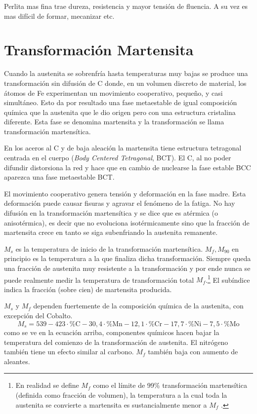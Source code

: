 Perlita mas fina trae dureza, resistencia y mayor tensión de fluencia. A su vez es mas difícil de formar, mecanizar etc.

\section{Transformación Martensita}
Cuando la austenita se sobrenfría hasta temperaturas muy bajas se produce una transformación sin difusión de C donde, en un volumen discreto de material, los átomos de Fe experimentan un movimiento cooperativo, pequeño, y casi simultáneo. Esto da por resultado una fase metaestable de igual composición química que la austenita que le dio origen pero con una estructura cristalina diferente. Esta fase se denomina martensita y la transformación se llama transformación martensítica.

En los aceros al C y de baja aleación la martensita tiene estructura tetragonal centrada en el cuerpo (\textit{Body Centered Tetragonal}, BCT). El C, al no poder difundir distorsiona la red y hace que en cambio de nuclearse la fase estable BCC aparezca una fase metaestable BCT.

El movimiento cooperativo genera tensión y deformación en la fase madre. Esta deformación puede causar fisuras y agravar el fenómeno de la fatiga. No hay difusión en la transformación martensítica y se dice que es atérmica (o anisotérmica), es decir que no evoluciona isotérmicamente sino que la fracción de martensita crece en tanto se siga subenfriando la austenita remanente.

$M_s$ es la temperatura de inicio de la transformación martensítica. $M_f,M_{90}$ en principio es la temperatura a la que finaliza dicha transformación. Siempre queda una fracción de austenita muy resistente a la transformación y por ende nunca se puede realmente medir la temperatura de transformación total $M_f$.\footnote{En realidad se define $M_f$ como el límite de 99\% transformación martensítica (definida como fracción de volumen), la temperatura a la cual toda la austenita se convierte a martensita es sustancialmente menor a $M_f$ \cite{gottstein2013physical}.} El subíndice indica la fracción (sobre cien) de martensita producida.

$M_s$ y $M_f$ dependen fuertemente de la composición química de la austenita, con excepción del Cobalto.
\begin{equation}
    M_s=539-423\cdot \% \mathrm{C}-30,4\cdot \% \mathrm{M n}-12,1\cdot \% \mathrm{Cr}-17,7\cdot \% \mathrm{Ni}-7,5\cdot \% \mathrm{Mo}
\end{equation}
como se ve en la ecuación arriba, componentes químicos hacen bajar la temperatura del comienzo de la transformación de austenita. El nitrógeno también tiene un efecto similar al carbono. $M_f$ también baja con aumento de aleantes.

